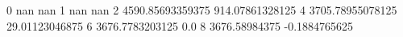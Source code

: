 0 nan nan
1 nan nan
2 4590.85693359375 914.07861328125
4 3705.78955078125 29.01123046875
6 3676.7783203125 0.0
8 3676.58984375 -0.1884765625
